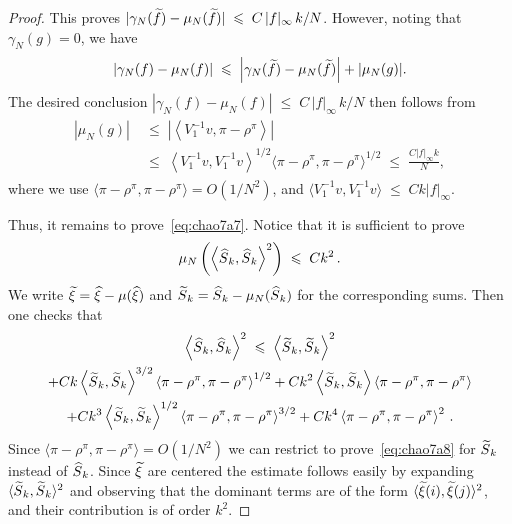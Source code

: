 \documentclass[10pt,a4paper]{article}
\renewcommand{\leq}{\;\leqslant\;}
\newcommand{\rhoN}{\rho^{\pi}}
\newcommand{\scalar}[2]{\langle #1, #2\rangle}
\let\g=\gamma
\let\oldtilde\tilde
\renewcommand*{\tilde}[1]{\mathchoice{\widetilde{#1}}{\widetilde{#1}}{\oldtilde{#1}}{\oldtilde{#1}}}
\let\oldhat\hat
\renewcommand*{\hat}[1]{\mathchoice{\widehat{#1}}{\widehat{#1}}{\oldhat{#1}}{\oldhat{#1}}}
\begin{document}
\begin{proof}
This proves $|\g_N(\tilde f)-\mu_N(\tilde f)|\leq C \,|f|_\infty\,k/N$. However, noting that $\g_N(g)=0$, we have
\begin{align}\label{eq:chaoa1}
|\g_N(f)-\mu_N(f)|\leq \left|\g_N(\tilde f)-\mu_N(\tilde f)\right|+|\mu_N(g)|.
\end{align}
The desired conclusion $|\g_N(f)-\mu_N(f)|\leq C \,|f|_\infty\,k/N$ then follows from
\begin{align}\label{eq:chaoap1}
\begin{split}
|\mu_N(g)|&\leq \left|\left\langle V_1^{-1}v,\pi-\rhoN\right\rangle\right|\\
&\leq \left\langle V_1^{-1}v,V_1^{-1}v\right\rangle^{1/2}\scalar{\pi-\rhoN}{\pi-\rhoN}^{1/2} \leq \frac{C|f|_\infty k}{N},
\end{split}
\end{align}
where we use $\scalar{\pi-\rhoN}{\pi-\rhoN}=O(1/N^2)$, and $\scalar{V_1^{-1}v}{V_1^{-1}v}\leq Ck|f|_\infty$.

Thus, it remains to prove~\eqref{eq:chao7a7}. Notice that it is sufficient to prove
\begin{align}\label{eq:chao7a8}
\mu_N\left(\left\langle\hat S_k,\hat S_k\right\rangle^2\right)
\leq C k^2\,.
\end{align}
We write $\tilde \xi = \hat \xi - \mu(\hat \xi)$ and $\tilde S_k=\hat S_k - \mu_N(\hat S_k)$ for the corresponding sums. Then one checks that
\begin{multline}\label{eq:chao7a9}
\left\langle\hat S_k,\hat S_k\right\rangle^2
\leq \left\langle\tilde S_k,\tilde S_k\right\rangle^2 \\
+ Ck\left\langle\tilde S_k,\tilde S_k\right\rangle^{3/2}\left\langle\pi-\rhoN,\pi-\rhoN\right\rangle^{1/2}
+ Ck^2\left\langle\tilde S_k,\tilde S_k\right\rangle
\left\langle\pi-\rhoN,\pi-\rhoN\right\rangle \\
+ Ck^3\left\langle\tilde S_k,\tilde S_k\right\rangle^{1/2}\left\langle\pi-\rhoN,\pi-\rhoN\right\rangle^{3/2} + Ck^4\left\langle\pi-\rhoN,\pi-\rhoN\right\rangle^2\,.
\end{multline}
Since $\scalar{\pi-\rhoN}{\pi-\rhoN}=O(1/N^2)$ we can restrict to prove~\eqref{eq:chao7a8} for $\tilde S_k$ instead of $\hat S_k$. Since $\tilde \xi$ are centered the estimate follows easily by expanding $\scalar{\tilde S_k}{\tilde S_k}^2$ and observing that the dominant terms are of the form $\scalar{\tilde\xi(i)}{\tilde\xi(j)}^2$, and their contribution is of order $k^2$.
\end{proof}
\end{document}
